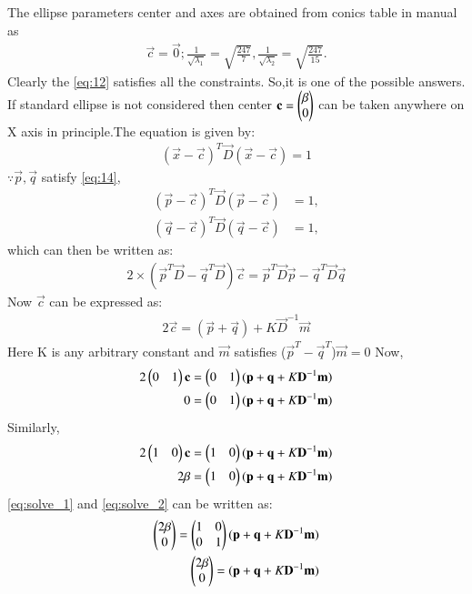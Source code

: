 \documentclass[journal,12pt,twocolumn]{IEEEtran}
\begin{document}
The ellipse parameters center and axes are obtained from conics table in manual as
\begin{align}
\vec{c} = \vec{0};
\frac{1}{\sqrt{\lambda_1}}  = \sqrt{\frac{247}{7}},
\frac{1}{\sqrt{\lambda_2}}  = \sqrt{\frac{247}{15}}.
\end{align}
Clearly the \eqref{eq:12} satisfies all the constraints. So,it is one of the possible answers.
If standard ellipse is not considered then center $\mathbf{c}=\begin{pmatrix}\beta\\0\end{pmatrix}$ can be taken anywhere on X axis in principle.The equation is given by:
\begin{align}
(\vec{x}-\vec{c})^T\vec{D}(\vec{x}-\vec{c})=1\label{eq:14}
\end{align}
$\because \vec{p}, \vec{q}$ satisfy \eqref{eq:14},
\begin{align}
\label{eq:ellipse_std_ab}
(\vec{p}-\vec{c})^T\vec{D}(\vec{p}-\vec{c}) &= 1,
\\
(\vec{q}-\vec{c})^T\vec{D}(\vec{q}-\vec{c}) &= 1,
\end{align}
which can then be written as:
\begin{align}
    2\times(\vec{p}^T\vec{D}-\vec{q}^T\vec{D})\vec{c}=\vec{p}^T\vec{D}\vec{p}-\vec{q}^T\vec{D}\vec{q}
\end{align}
Now $\vec{c}$ can be expressed as:
\begin{align}
2\vec{c}=(\vec{p}+\vec{q})+K\vec{D}^{-1}\vec{m}
\end{align}
Here K is any arbitrary constant and $\vec{m}$ satisfies ($\vec{p}^T-\vec{q}^T$)$\vec{m}=0$
Now,
\begin{align}
2\begin{pmatrix}0&1\end{pmatrix}\mathbf{c}&=\begin{pmatrix}0&1\end{pmatrix}(\mathbf{p}+\mathbf{q}+K\mathbf{D}^{-1}\mathbf{m})\\
0&=\begin{pmatrix}0&1\end{pmatrix}(\mathbf{p}+\mathbf{q}+K\mathbf{D}^{-1}\mathbf{m})\label{eq:solve_1}
\end{align}
Similarly,
\begin{align}
2\begin{pmatrix}1&0\end{pmatrix}\mathbf{c}&=\begin{pmatrix}1&0\end{pmatrix}(\mathbf{p}+\mathbf{q}+K\mathbf{D}^{-1}\mathbf{m})\\
2\beta&=\begin{pmatrix}1&0\end{pmatrix}(\mathbf{p}+\mathbf{q}+K\mathbf{D}^{-1}\mathbf{m})\label{eq:solve_2}
\end{align}
\eqref{eq:solve_1} and \eqref{eq:solve_2} can be written as:
\begin{align}
    \begin{pmatrix}2\beta\\0\end{pmatrix}=\begin{pmatrix}1&0\\0&1\end{pmatrix}(\mathbf{p}+\mathbf{q}+K\mathbf{D}^{-1}\mathbf{m})\\
    \begin{pmatrix}2\beta\\0\end{pmatrix}=(\mathbf{p}+\mathbf{q}+K\mathbf{D}^{-1}\mathbf{m})
\end{align}
\end{document}
